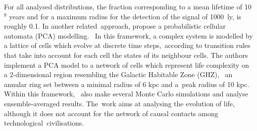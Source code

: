 \documentclass[crop]{CSLB}
\begin{document}
%
For all analysed distributions, the fraction corresponding to a mean
lifetime of 10$^9$ years and for a maximum radius for the detection of
the signal of 1000~ly, is roughly 0.1.
%
In another related approach, \citet{vukotic_astrobiological_2012}
propose a probabilistic cellular automata (PCA) modelling. 
%
In this framework, a complex system is modelled by a lattice of cells
which evolve at discrete time steps, according to transition rules
that take into account for each cell the states of its neighbour
cells.
%
The authors implement a PCA model to a network of cells which
represent life complexity on a 2-dimensional region resembling the
Galactic Habitable Zone (GHZ),  an annular ring set between a minimal
radius of 6 kpc and a peak radius of 10 kpc. 
%
Within this framework, \citet{vukotic_astrobiological_2012} also make
several Monte Carlo simulations and analyse ensemble-averaged results.
%
The work aims at analysing the evolution of life, although it does not
account for the network of causal contacts among
technological civilisations.
\end{document}
